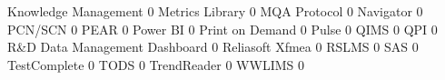 \documentclass{article}
\begin{document}
\begin{Schunk}
\begin{Soutput}
  Knowledge Management                                                       0
  Metrics Library                                                            0
  MQA Protocol                                                               0
  Navigator                                                                  0
  PCN/SCN                                                                    0
  PEAR                                                                       0
  Power BI                                                                   0
  Print on Demand                                                            0
  Pulse                                                                      0
  QIMS                                                                       0
  QPI                                                                        0
  R&D Data Management Dashboard                                              0
  Reliasoft Xfmea                                                            0
  RSLMS                                                                      0
  SAS                                                                        0
  TestComplete                                                               0
  TODS                                                                       0
  TrendReader                                                                0
  WWLIMS                                                                     0
                                                           

\end{Soutput}
\end{Schunk}
\end{document}
